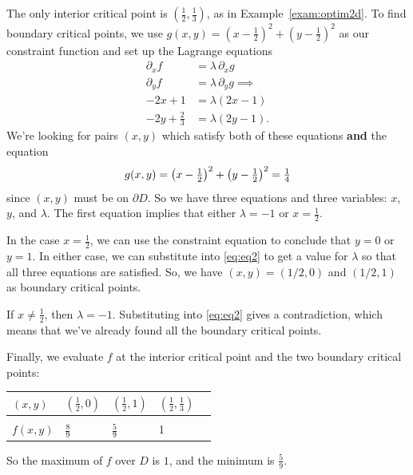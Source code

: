 \documentclass[prettycode,shellescape]{watsonbook}
\begin{document}
\begin{solution}
  The only interior critical point is
  $\left(\tfrac{1}{2},\tfrac{1}{3}\right)$, as in
  Example~\ref{exam:optim2d}. To find boundary critical points, we
  use
  $g(x,y) = \left(x-\frac{1}{2}\right)^2 + \left(y -
    \frac{1}{2}\right)^2$ as our constraint function and set up the
  Lagrange equations
  \begin{align} \nonumber
    \partial_x f &= \lambda \, \partial_x g \\ \nonumber
    \partial_y f &= \lambda \, \partial_y g \implies \\ 
    -2x + 1 &= \lambda(2x - 1)  \\ \label{eq:eq2}
    -2y + \tfrac{2}{3} &= \lambda(2y-1). 
  \end{align}
  We're looking for pairs $(x,y)$ which satisfy both of these
  equations \textbf{and} the equation
  \begin{equation} 
    g(x,y) = \left(x-\tfrac{1}{2}\right)^2 +
    \left(y-\tfrac{1}{2}\right)^2 = \tfrac{1}{4} \\ 
  \end{equation}
  since
  $(x,y)$ must be on $\partial D$. So we have three equations and three
  variables: $x$, $y$, and $\lambda$. The first equation implies
  that either $\lambda = -1$ or $x = \tfrac{1}{2}$.

  In the case $x = \frac{1}{2}$, we can use the constraint equation
  to conclude that $y = 0$ or $y = 1$. In either case, we can
  substitute into \eqref{eq:eq2} to get a value for $\lambda$ so
  that all three equations are satisfied. So, we have
  $(x,y) = (1/2, 0)$ and $(1/2,1)$ as boundary critical points.

  If $x \neq \tfrac{1}{2}$, then $\lambda = -1$. Substituting into
  \eqref{eq:eq2} gives a contradiction, which means that we've
  already found all the boundary critical points.

  Finally, we evaluate $f$ at the interior critical point and the
  two boundary critical points: \vspace{-12pt}
  \begin{center}
    \begin{tabular}{M{1.2cm}|M{1.2cm}M{1.2cm}M{1.2cm}N}
      $(x,y)$ & $\left(\frac{1}{2}, 0\right)$  & $\left(\frac{1}{2},
                                                 1\right)$ &
                                                             $\left(\frac{1}{2},
                                                             \frac{1}{3} \right)$ &
      \\[12pt] \hline  \\[-8pt] 
      $f(x,y)$ & $\frac{8}{9}$ & $\frac{5}{9}$ & 1 &  \\
    \end{tabular}
  \end{center}
  So the maximum of $f$ over $D$ is $1$, and the minimum is
  $\frac{5}{9}$. 
\end{solution}
\end{document}
